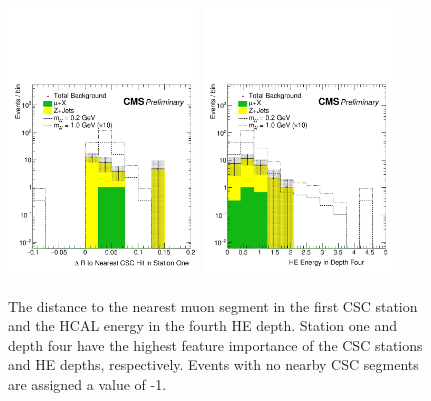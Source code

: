 \begin{figure}[htbp]
	\centering
	\includegraphics[width=0.45\textwidth]{figures/partDisappCSCDr_1.pdf}
	\hspace{0.01\textwidth}
	\includegraphics[width=0.45\textwidth]{figures/partDisappHEDepth_4.pdf}
	\caption[Expected Partial Disappearance CSC and HCAL Features]{The distance to the nearest muon segment in the first CSC station and the HCAL energy in the fourth HE depth. Station one and depth four have the highest feature importance of the CSC stations and HE depths, respectively. Events with no nearby CSC segments are assigned a value of -1.}
	\label{fig:partStat}
\end{figure}

